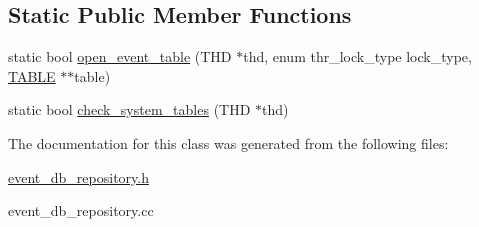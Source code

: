 \subsection*{Static Public Member Functions}
\begin{DoxyCompactItemize}
\item 
static bool \mbox{\hyperlink{group__Event__Scheduler_ga019f518dd8c841d910161407064682c1}{open\+\_\+event\+\_\+table}} (T\+HD $\ast$thd, enum thr\+\_\+lock\+\_\+type lock\+\_\+type, \mbox{\hyperlink{structTABLE}{T\+A\+B\+LE}} $\ast$$\ast$table)
\item 
static bool \mbox{\hyperlink{group__Event__Scheduler_gacea1505a895adc5f905dc86bc046b29f}{check\+\_\+system\+\_\+tables}} (T\+HD $\ast$thd)
\end{DoxyCompactItemize}


The documentation for this class was generated from the following files\+:\begin{DoxyCompactItemize}
\item 
\mbox{\hyperlink{event__db__repository_8h}{event\+\_\+db\+\_\+repository.\+h}}\item 
event\+\_\+db\+\_\+repository.\+cc\end{DoxyCompactItemize}
